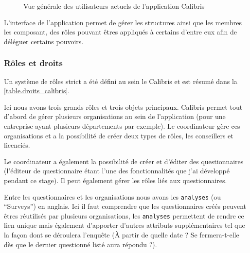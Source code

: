 \documentclass[12pt,a4paper]{book}
\begin{document}
\begin{figure}[h]
   \centering
{}
\caption{Vue générale des utilisateurs actuels de l'application Calibris} 
\label{fig.calibris_clients}
\end{figure}

L'interface de l'application permet de gérer les structures ainsi que les membres les composant, des rôles pouvant êtres appliqués à certains d'entre eux afin de déléguer certains pouvoirs. 

\subsubsection{Rôles et droits}

Un système de rôles strict a été défini au sein le Calibris et est résumé dans la \cref{table.droits_calibris}.

Ici nous avons trois grands rôles et trois objets principaux. Calibris permet tout d'abord de gérer plusieurs organisations au sein de l'application (pour une entreprise ayant plusieurs départements par exemple). Le coordinateur gère ces organisations et a la possibilité de créer deux types de rôles, les conseillers et licenciés.

Le coordinateur a également la possibilité de créer et d'éditer des questionnaires (l'éditeur de questionnaire étant l'une des fonctionnalités que j'ai développé pendant ce stage). Il peut également gérer les rôles liés aux questionnaires.

Entre les questionnaires et les organisations nous avons les \texttt{analyses} (ou ``Surveys'') en anglais. Ici il faut comprendre que les questionnaires créés peuvent êtres réutilisés par plusieurs organisations, les \texttt{analyses} permettent de rendre ce lien unique mais également d'apporter d'autres attributs supplémentaires tel que la façon dont se déroulera l'enquête (À partir de quelle date ? Se fermera-t-elle dès que le dernier questionné listé aura répondu ?).
\end{document}
